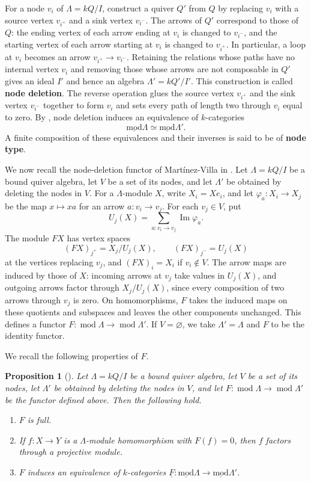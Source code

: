 \documentclass[11pt]{article}
\renewcommand{\Im}{\operatorname{Im}}
\renewcommand{\mod}{\operatorname{mod}}
\newcommand{\smod}{\operatorname{\underline{mod}}}
\providecommand{\varLambda}{\Lambda}
\newtheorem{proposition}[theorem]{Proposition}
\theoremstyle{definition}
\begin{document}
		For a node $v_i$ of $\varLambda=kQ/I$, construct a quiver $Q'$ from $Q$ by replacing $v_i$ with a source vertex $v_{i^+}$ and a sink vertex $v_{i^-}$.
		The arrows of $Q'$ correspond to those of $Q$: the ending vertex of each arrow ending at $v_i$ is changed to $v_{i^-}$, and the starting vertex of each arrow starting at $v_i$ is changed to $v_{i^+}$.
		In particular, a loop at $v_i$ becomes an arrow $v_{i^+}\to v_{i^-}$.
		Retaining the relations whose paths have no internal vertex $v_i$ and removing those whose arrows are not composable in $Q'$ gives an ideal $I'$ and hence an algebra $\varLambda'=kQ'/I'$.
		This construction is called \textbf{node deletion}.
		The reverse operation glues the source vertex $v_{i^+}$ and the sink vertex $v_{i^-}$ together to form $v_i$ and sets every path of length two through $v_i$ equal to zero.
		By \cite[Theorem~2.10(c)]{Mar80}, node deletion induces an equivalence of $k$-categories $$\smod\varLambda\simeq\smod\varLambda'.$$ 		A finite composition of these equivalences and their inverses is said to be of \textbf{node type}.

		We now recall the node-deletion functor of Mart\'inez-Villa in \cite[Section~2]{Mar80}. Let $\varLambda=kQ/I$ be a bound quiver algebra,
		let $V$ be a set of its nodes, and let $\varLambda'$ be obtained by deleting the nodes in $V$. For a $\varLambda$-module $X$, write $X_i=Xe_i$, and let
		$\varphi_a:X_i\to X_j$ be the map $x\mapsto xa$ for an arrow $a:v_i\to v_j$. For each $v_j\in V$, put
		\[
			U_j(X)=\sum_{a:v_i\to v_j}\Im\varphi_a.
		\]
		The module $FX$ has vertex spaces
		\[
			(FX)_{j^+}=X_j/U_j(X),\qquad (FX)_{j^-}=U_j(X)
		\]
		at the vertices replacing $v_j$, and $(FX)_i=X_i$ if $v_i\notin V$. The arrow maps are induced by those of $X$: incoming arrows at $v_j$ take values in $U_j(X)$, and outgoing arrows factor through $X_j/U_j(X)$, since every composition of two arrows through $v_j$ is zero. On homomorphisms, $F$ takes the induced maps on these quotients and subspaces and leaves the other components unchanged. This defines a functor $F\colon\mod\varLambda\to\mod\varLambda'$. If $V=\varnothing$, we take $\varLambda'=\varLambda$ and $F$ to be the identity functor.

		We recall the following properties of $F$.

		\begin{proposition}[{\cite[Proposition~2.7, Lemma~2.8, and Theorem~2.10(c)]{Mar80}}]
			\label{proposition of node deletion}
			Let $\varLambda=kQ/I$ be a bound quiver algebra, let $V$ be a set of its nodes, let $\varLambda'$ be obtained by deleting the nodes in $V$, and let $F:\mod\varLambda\to\mod\varLambda'$ be the functor defined above. Then the following hold.
			\begin{enumerate}
				\item $F$ is full.
				\item If $f:X\to Y$ is a $\varLambda$-module homomorphism with $F(f)=0$, then $f$ factors through a projective module.
				\item $F$ induces an equivalence of $k$-categories $\underline F:\smod\varLambda\to\smod\varLambda'$.
			\end{enumerate}
		\end{proposition}
\end{document}

